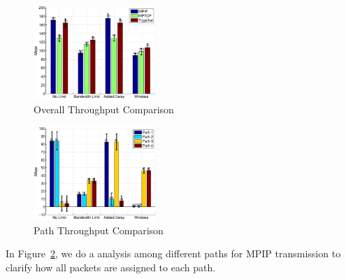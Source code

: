 \begin{figure}
\centering
\includegraphics[width=0.8\linewidth,height=1.4in]{fig/tp_bar.eps}
\caption{Overall Throughput Comparison}
\label{fig.tp_bar}
\end{figure}

\begin{figure}
\centering
\includegraphics[width=0.8\linewidth,height=1.4in]{fig/path_tp_bar.eps}
\caption{Path Throughput Comparison}
\label{fig.path_tp_bar}
\end{figure}




In Figure~\ref{fig.path_tp_bar}, we do a analysis among different paths for MPIP transmission to clarify how all packets are assigned to each path.


